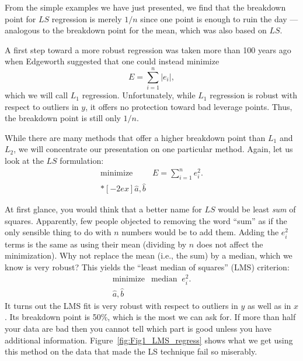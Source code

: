 
From the simple examples we have just presented, we find that the breakdown point for $LS$ 
regression is merely $1/n$ since one point is enough to ruin the day --- analogous to the breakdown 
point for the mean, which was also based on $LS$.
	
A first step toward a more robust regression was taken more than 100 years ago when 
Edgeworth suggested that one could instead minimize
\begin{equation}
E = \sum^n_{i=1} |e_i|,
\end{equation}	 
which we will call $L_1$ regression.  Unfortunately, while $L_1$ regression is robust with respect to 
outliers in $y$, it offers no protection toward bad leverage points.  Thus, the breakdown point is 
still only $1/n$.
	
While there are many methods that offer a higher breakdown point than $L_1$ and $L_2$, we will 
concentrate our presentation on one particular method.  Again, let us look at the $LS$ formulation:
$$
\begin{array}{cc}
\mbox{minimize} & \displaystyle E = \sum^n_{i=1} e^2_i. \\*[-2ex]
\hat{a}, \hat{b} \end{array}
$$
	 

At first glance, you would think that a better name for $LS$ would be least \emph{sum} of squares.  
Apparently, few people objected to removing the word ``sum'' as if the only sensible thing to do 
with $n$ numbers would be to add them.  Adding the $e_i^2$ terms is the same as using their mean (dividing 
by $n$ does not affect the minimization).  Why not replace the mean (i.e., the sum) by a median, which we know is 
very robust?  This yields the ``least median of squares'' (LMS) criterion:
\begin{equation}
\begin{array}{cc}
\mbox{minimize} & \mbox{median } \ e^2_i. \\
    \hat{a}, \hat{b} \end{array}
\end{equation}	 
It turns out the LMS fit is very robust with respect to outliers in $y$ as well as in $x$.  Its breakdown 
point is 50\%, which is the most we can ask for.  If more than half your data are bad then you cannot tell
which part is good unless you have additional information.
Figure~\ref{fig:Fig1_LMS_regress} shows what we get
using this method on the data that made the LS technique fail so miserably.
	
